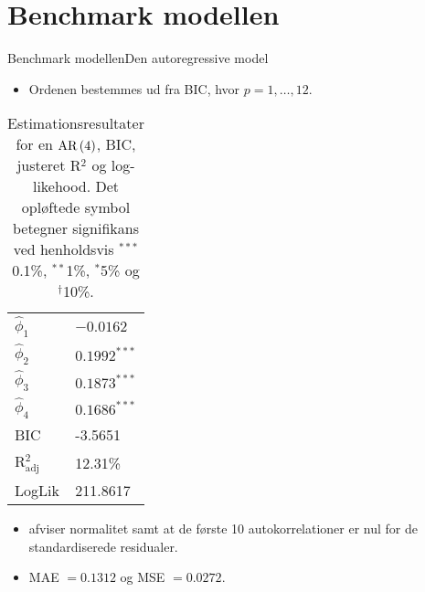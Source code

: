 \section{Benchmark modellen}
\begin{frame}{Benchmark modellen}{Den autoregressive model}
\begin{itemize}
\item Ordenen bestemmes ud fra BIC, hvor \(p = 1,\ldots, 12\).
\end{itemize}
\begin{table}[h]
\center
\begin{tabular}{ll}
\toprule
$\widehat{\phi}_1$ &$ -0.0162 $ \\
$\widehat{\phi}_2$ & $0.1992^{***}$  \\
$\widehat{\phi}_3$ &$0.1873^{***}$  \\
$\widehat{\phi}_4$ &$0.1686^{***} $ \\ \midrule
BIC & -3.5651 \\
 R$^2_{\text{adj}}$ & 12.31\% \\
LogLik &  211.8617\\ \bottomrule
 \end{tabular}
\caption{Estimationsresultater for en \(\text{AR} \del{4}\), BIC, justeret R$^2$ og log-likehood. Det opløftede symbol betegner signifikans ved henholdsvis $^{***}$0.1\%, $^{**}$1\%, $^{*}$5\% og $^{\dagger}$10\%.} \label{tab:est_ar}
\end{table}
\begin{itemize}
\item afviser normalitet samt at de første 10 autokorrelationer er nul for de standardiserede residualer.
\item MAE $= 0.1312$ og MSE $= 0.0272$.
\end{itemize}
\end{frame}


